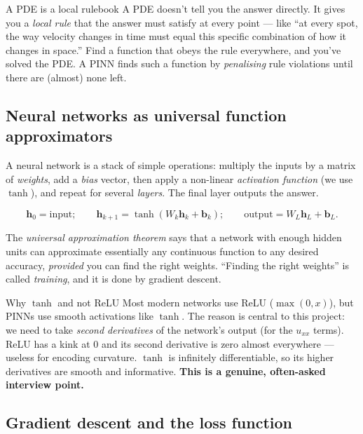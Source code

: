 \documentclass[11pt,a4paper]{article}
\begin{document}
\begin{intuitionbox}{A PDE is a local rulebook}
A PDE doesn't tell you the answer directly. It gives you a \emph{local rule}
that the answer must satisfy at every point --- like ``at every spot, the way
velocity changes in time must equal this specific combination of how it changes
in space.'' Find a function that obeys the rule everywhere, and you've solved
the PDE. A PINN finds such a function by \emph{penalising} rule violations until
there are (almost) none left.
\end{intuitionbox}

\subsection{Neural networks as universal function approximators}
\label{sec:nn}

A neural network is a stack of simple operations: multiply the inputs by a
matrix of \emph{weights}, add a \emph{bias} vector, then apply a non-linear
\emph{activation function} (we use $\tanh$), and repeat for several
\emph{layers}. The final layer outputs the answer.

\begin{equation}
\mathbf{h}_0 = \text{input};\qquad
\mathbf{h}_{k+1} = \tanh(W_k \mathbf{h}_k + \mathbf{b}_k);\qquad
\text{output} = W_L \mathbf{h}_L + \mathbf{b}_L .
\end{equation}

The \emph{universal approximation theorem} says that a network with enough
hidden units can approximate essentially any continuous function to any desired
accuracy, \emph{provided} you can find the right weights. ``Finding the right
weights'' is called \emph{training}, and it is done by gradient descent.

\begin{conceptbox}{Why $\tanh$ and not ReLU}
Most modern networks use ReLU ($\max(0,x)$), but PINNs use smooth activations
like $\tanh$. The reason is central to this project: we need to take
\emph{second derivatives} of the network's output (for the $u_{xx}$ terms).
ReLU has a kink at $0$ and its second derivative is zero almost everywhere ---
useless for encoding curvature. $\tanh$ is infinitely differentiable, so its
higher derivatives are smooth and informative. \textbf{This is a genuine, often-asked interview point.}
\end{conceptbox}

\subsection{Gradient descent and the loss function}
\label{sec:gradient-descent}
\end{document}
